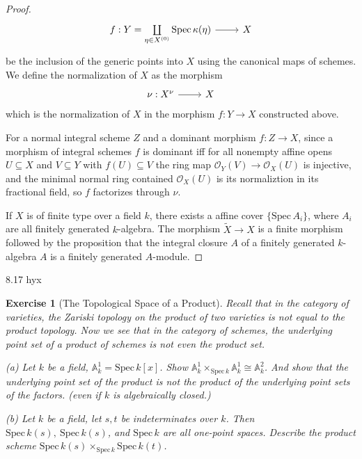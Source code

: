 \documentclass{amsart}
\newtheorem{exe}{Exercise}[subsection]
\theoremstyle{remark}\newtheorem{rmk}[theorem]{Remark}
\begin{document}
\begin{proof}
\begin{equation*}
	\begin{tikzcd}
		f: Y=\coprod\limits_{\eta \in X^{(0)}} \operatorname{Spec}\kappa(\eta) \arrow[r] & X
	\end{tikzcd}
\end{equation*}
be the inclusion of the generic points into $X$ using the canonical maps of schemes.  
We define the normalization of $X$ as the morphism
\begin{equation*}
	\begin{tikzcd}
		\nu: X^{\nu} \arrow[r] & X
	\end{tikzcd}
\end{equation*}
which is the normalization of $X$ in the morphism $f: Y \rightarrow X$ constructed above.

For a normal integral scheme $Z$ and a dominant morphism $f: Z \rightarrow X$,  since a morphism of integral schemes $f$ is dominant  iff for all nonempty affine opens $U \subseteq X$ and $V \subseteq Y$ with $f(U) \subseteq V$ the ring map $\mathcal{O}_{Y}(V) \rightarrow \mathcal{O}_{X}(U)$ is injective,  and the minimal normal ring contained $\mathcal{O}_{X}(U)$ is its normaliztion in its fractional field,  so $f$ factorizes through $\nu$.

If $X$ is of finite type over a field $k$,  there exists a affine cover $\{\mathrm{Spec}\,A_{i}\}$,  where $A_{i}$ are all finitely generated $k$-algebra.  The morphism $\widetilde{X} \rightarrow X$ is a finite morphism followed by the proposition that the integral closure $A$ of a finitely generated $k$-algebra $A$ is a finitely generated $A$-module.
\end{proof}
8.17 hyx

\begin{exe}[The Topological Space of a Product]
	Recall that in the category of varieties, the Zariski topology on the product of two varieties is not equal to the product topology. Now we see that in the category of schemes, the underlying point set of a product of schemes is not even the product set.
	
	(a) Let $k$ be a field, $\mathbb{A}_k^1=\mathrm{Spec}\, k[x]$. Show $\mathbb{A}_k^1 \times_{\mathrm{Spec}\, k} \mathbb{A}_k^1\cong \mathbb{A}_k^2$. And show that the underlying
	point set of the product is not the product of the underlying point sets of the factors. (even if $k$ is algebraically closed.)
	
	(b) Let $k$ be a field, let $s,t$ be indeterminates over $k$. Then $\mathrm{Spec}\,k(s),\ \mathrm{Spec}\,k(s)$, and $\mathrm{Spec}\,k$ are all one-point spaces. Describe the product scheme $\mathrm{Spec}\, k(s)\times_{\mathrm{Spec}\, k}\mathrm{Spec}\, k(t)$.
\end{exe}
\end{document}
